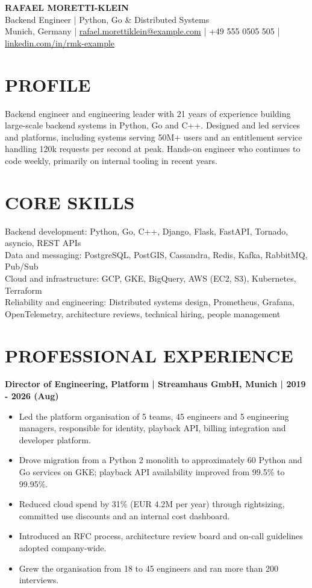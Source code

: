 \documentclass[11pt,a4paper]{article}
\begin{document}
\begin{center}
{\LARGE\bfseries\color{primarycolor} RAFAEL MORETTI-KLEIN}\\[0.25em]
{\large Backend Engineer | Python, Go \& Distributed Systems}\\[0.2em]
Munich, Germany | \href{mailto:rafael.morettiklein@example.com}{rafael.morettiklein@example.com} | +49 555 0505 505 | \href{https://linkedin.com/in/rmk-example}{linkedin.com/in/rmk-example}
\end{center}

\section*{PROFILE}
Backend engineer and engineering leader with 21 years of experience building large-scale backend systems in Python, Go and C++. Designed and led services and platforms, including systems serving 50M+ users and an entitlement service handling 120k requests per second at peak. Hands-on engineer who continues to code weekly, primarily on internal tooling in recent years.

\section*{CORE SKILLS}
Backend development: Python, Go, C++, Django, Flask, FastAPI, Tornado, asyncio, REST APIs\\
Data and messaging: PostgreSQL, PostGIS, Cassandra, Redis, Kafka, RabbitMQ, Pub/Sub\\
Cloud and infrastructure: GCP, GKE, BigQuery, AWS (EC2, S3), Kubernetes, Terraform\\
Reliability and engineering: Distributed systems design, Prometheus, Grafana, OpenTelemetry, architecture reviews, technical hiring, people management

\section*{PROFESSIONAL EXPERIENCE}
\textbf{Director of Engineering, Platform | Streamhaus GmbH, Munich | 2019 - 2026 (Aug)}
\begin{itemize}
\item Led the platform organisation of 5 teams, 45 engineers and 5 engineering managers, responsible for identity, playback API, billing integration and developer platform.
\item Drove migration from a Python 2 monolith to approximately 60 Python and Go services on GKE; playback API availability improved from 99.5\% to 99.95\%.
\item Reduced cloud spend by 31\% (EUR 4.2M per year) through rightsizing, committed use discounts and an internal cost dashboard.
\item Introduced an RFC process, architecture review board and on-call guidelines adopted company-wide.
\item Grew the organisation from 18 to 45 engineers and ran more than 200 interviews.
\end{itemize}
\end{document}

